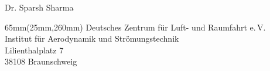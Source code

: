 \documentclass[11pt,a4paper]{article}
\newcommand{\ClosingName}{Dr. Sparsh Sharma}
\begin{document}
\ClosingName

\begin{textblock*}{65mm}(25mm,260mm)
  \scriptsize
  Deutsches Zentrum für Luft- und Raumfahrt e.\,V.\\
  Institut für Aerodynamik und Strömungstechnik\\
  Lilienthalplatz 7\\
  38108 Braunschweig
\end{textblock*}

\end{document}
